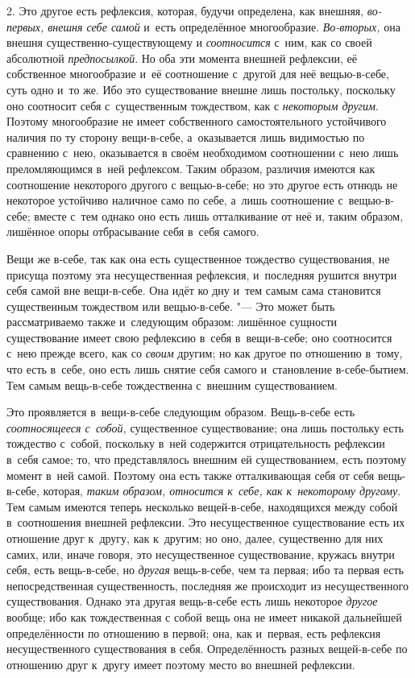2. Это другое есть рефлексия, которая, будучи определена, как внешняя,
{\em во-первых, внешня себе самой} и~есть определённое многообразие.
{\em Во-вторых,} она внешня существенно-существующему и
{\em соотносится} с~ним, как со своей абсолютной
{\em предпосылкой}. Но оба эти момента внешней
рефлексии, её собственное многообразие и~её соотношение с~другой для неё
вещью-в-себе, суть одно и~то же. Ибо это существование внешне лишь
постольку, поскольку оно соотносит себя с~существенным тождеством, как с
{\em некоторым другим}. Поэтому многообразие не имеет
собственного самостоятельного устойчивого наличия по ту сторону
вещи-в-себе, а~оказывается лишь видимостью по сравнению с~нею, оказывается
в своём необходимом соотношении с~нею лишь преломляющимся в~ней рефлексом.
Таким образом, различия имеются как соотношение некоторого другого с
вещью-в-себе; но это другое есть отнюдь не некоторое устойчиво наличное
само по себе, а~лишь соотношение с~вещью-в-себе; вместе с~тем однако оно
есть лишь отталкивание от неё и, таким образом, лишённое опоры отбрасывание
себя в~себя самого.

Вещи же в-себе, так как она есть существенное тождество существования, не
присуща поэтому эта несущественная рефлексия, и~последняя рушится внутри
себя самой вне вещи-в-себе. Она идёт ко дну и~тем самым сама становится
существенным тождеством или вещью-в-себе. "--- Это может быть рассматриваемо
также и~следующим образом: лишённое сущности существование имеет свою
рефлексию в~себя в~вещи-в-себе; оно соотносится с~нею прежде всего, как со
{\em своим} другим; но как другое по отношению в~тому,
что есть в~себе, оно есть лишь снятие себя самого и~становление
в-себе-бытием. Тем самым вещь-в-себе тождественна с~внешним существованием.

Это проявляется в~вещи-в-себе следующим образом. Вещь-в-себе есть
{\em соотносящееся с~собой,} существенное
существование; она лишь постольку есть тождество с~собой, поскольку в~ней
содержится отрицательность рефлексии в~себя самое; то, что представлялось
внешним ей существованием, есть поэтому момент в~ней самой. Поэтому она
есть также отталкивающая себя от себя вещь-в-себе, которая,
{\em таким образом, относится к~себе, как к~некоторому
другому}. Тем самым имеются теперь несколько вещей-в-себе, находящихся
между собой в~соотношения внешней рефлексии. Это несущественное
существование есть их отношение друг к~другу, как к~другим; но оно, далее,
существенно для них самих, или, иначе говоря, это несущественное
существование, кружась внутри себя, есть вещь-в-себе, но
{\em другая} вещь-в-себе, чем та первая; ибо та первая
есть непосредственная существенность, последняя же происходит из
несущественного существования. Однако эта другая вещь-в-себе есть лишь
некоторое {\em другое} вообще; ибо как тождественная с
собой вещь она не имеет никакой дальнейшей определённости по отношению в
первой; она, как и~первая, есть рефлексия несущественного существования в
себя. Определённость разных вещей-в-себе по отношению друг к~другу имеет
поэтому место во внешней рефлексии.

